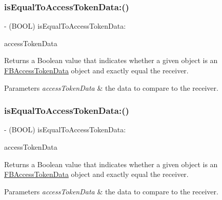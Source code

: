 \subsubsection{\texorpdfstring{is\+Equal\+To\+Access\+Token\+Data\+:()}{isEqualToAccessTokenData:()}\hspace{0.1cm}{\footnotesize\ttfamily [3/5]}}
{\footnotesize\ttfamily -\/ (B\+O\+OL) is\+Equal\+To\+Access\+Token\+Data\+: \begin{DoxyParamCaption}\item[{(\hyperlink{interfaceFBAccessTokenData}{F\+B\+Access\+Token\+Data} $\ast$)}]{access\+Token\+Data }\end{DoxyParamCaption}}

Returns a Boolean value that indicates whether a given object is an \hyperlink{interfaceFBAccessTokenData}{F\+B\+Access\+Token\+Data} object and exactly equal the receiver.


\begin{DoxyParams}{Parameters}
{\em access\+Token\+Data} & the data to compare to the receiver. \\
\hline
\end{DoxyParams}
\mbox{\label{interfaceFBAccessTokenData_ac4da9dbf9d0c3c0bceb2d6b93cd764e2}} 
\subsubsection{\texorpdfstring{is\+Equal\+To\+Access\+Token\+Data\+:()}{isEqualToAccessTokenData:()}\hspace{0.1cm}{\footnotesize\ttfamily [4/5]}}
{\footnotesize\ttfamily -\/ (B\+O\+OL) is\+Equal\+To\+Access\+Token\+Data\+: \begin{DoxyParamCaption}\item[{(\hyperlink{interfaceFBAccessTokenData}{F\+B\+Access\+Token\+Data} $\ast$)}]{access\+Token\+Data }\end{DoxyParamCaption}}

Returns a Boolean value that indicates whether a given object is an \hyperlink{interfaceFBAccessTokenData}{F\+B\+Access\+Token\+Data} object and exactly equal the receiver.


\begin{DoxyParams}{Parameters}
{\em access\+Token\+Data} & the data to compare to the receiver. \\
\hline
\end{DoxyParams}
\mbox{\label{interfaceFBAccessTokenData_ac4da9dbf9d0c3c0bceb2d6b93cd764e2}} 
